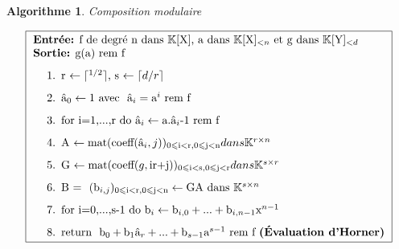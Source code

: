 \documentclass[a4paper]{article}
\begin{document}
\theoremstyle{algorithme}
\newtheorem*{al}{Algorithme}
\begin{al} 
Composition modulaire 

\[
\fbox{
    \begin{minipage}[c]{11cm}
        \textbf{Entrée:} f de degré n dans $\mathbb{K}[\mathrm{X}]$, a dans $\mathbb{K}[\mathrm{X}]_{<n}$ et \text{g} dans $\mathbb{K}[\mathrm{Y}]_{<d}$\\
        \textbf{Sortie:} \text{g(a) rem f}
        \begin{enumerate}
        \item \text{r} $\leftarrow \lceil ^{1/2} \rceil$, \text{s} $\leftarrow \lceil d/r \rceil$ 
        \item $\text{â}_{0} \leftarrow 1$ \text{avec } $\text{â}_{i}=\text{a}^{i} \text{ rem f}$
        \item \text{for i=1,...,r do} $\text{â}_{i} \leftarrow \text{a}.\text{â}_{i} \text{-1 rem f}$
        \item \text{A} $\leftarrow \text{mat}(\text{coeff}(\text{â}_{i},j))_{0\leqslant \text{i}<\text{r}, 0\leqslant \text{j}<\text{n}}  dans \mathbb{K}^{r\times n}$
        \item \text{G} $\leftarrow \text{mat}(\text{coeff}(g,\text{ir+j}))_{0\leqslant \text{i}<\text{s}, 0\leqslant \text{j}<\text{r}}  dans \mathbb{K}^{s\times r}$
        \item \text{B = } $(\text{b}_{i,j})_{0\leqslant \text{i}<\text{r}, 0\leqslant \text{j}<\text{n}} \leftarrow \text{GA } \text{dans } \mathbb{K}^{s\times n}$
        \item \text{for i=0,...,s-1 do} $\text{b}_{i} \leftarrow \text{b}_{i,0}+...+\text{b}_{i,n-1}\text{x}^{n-1}$
        \item \text{return } $\text{b}_{0}+\text{b}_{1}\text{â}_{r}+...+\text{b}_{s-1}\text{a}^{s-1} \text{ rem f } \textbf{(Évaluation d'Horner)}$ 
        \end{enumerate}
    \end{minipage}
}
\]
\end{al}
\end{document}
